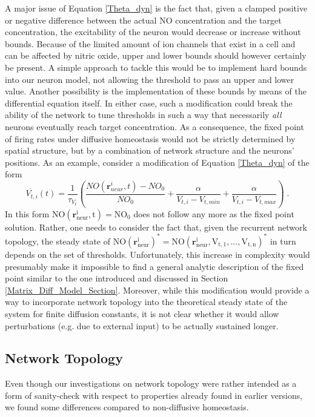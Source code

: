 \documentclass[10pt,a4paper]{article}
\begin{document}
A major issue of Equation \eqref{Theta_dyn} is the fact that, given a clamped positive or negative difference between the actual NO concentration and the target concentration, the excitability of the neuron would decrease or increase without bounds. Because of the limited amount of ion channels that exist in a cell and can be affected by nitric oxide, upper and lower bounds should however certainly be present. A simple approach to tackle this would be to implement hard bounds into our neuron model, not allowing the threshold to pass an upper and lower value. Another possibility is the implementation of these bounds by means of the differential equation itself. In either case, such a modification could break the ability of the network to tune thresholds in such a way that necessarily \emph{all} neurons eventually reach target concentration. As a consequence, the fixed point of firing rates under diffusive homeostasis would not be strictly determined by spatial structure, but by a combination of network structure and the neurons' positions. As an example, consider a modification of Equation \eqref{Theta_dyn} of the form
\begin{equation}
\dot{V_{t,i}}(t) = \frac{1}{\tau_{V_t}}\left(\frac{NO(\mathbf{r}_{neur}^i,t)-NO_0}{NO_0} + \frac{\alpha}{V_{t,i} - V_{t,min}} + \frac{\alpha}{V_{t,i} - V_{t,max}}\right) \; .
\label{Theta_dyn_with_Bounds}
\end{equation}
In this form $\mathrm{NO(\mathbf{r}_{neur}^i,t) = NO_0}$ does not follow any more as the fixed point solution. Rather, one needs to consider the fact that, given the recurrent network topology, the steady state of $\mathrm{NO(\mathbf{r}_{neur}^i)^* = NO(\mathbf{r}_{neur}^i,V_{t,1},...,V_{t,n})^*}$ in turn depends on the set of thresholds. Unfortunately, this increase in complexity would presumably make it impossible to find a general analytic description of the fixed point similar to the one introduced and discussed in Section \ref{Matrix_Diff_Model_Section}. Moreover, while this modification would provide a way to incorporate network topology into the theoretical steady state of the system for finite diffusion constants, it is not clear whether it would allow perturbations (e.g. due to external input) to be actually sustained longer.

\subsection{Network Topology} 
Even though our investigations on network topology were rather intended as a form of sanity-check with respect to properties already found in earlier versions, we found some differences compared to non-diffusive homeostasis.
\end{document}
